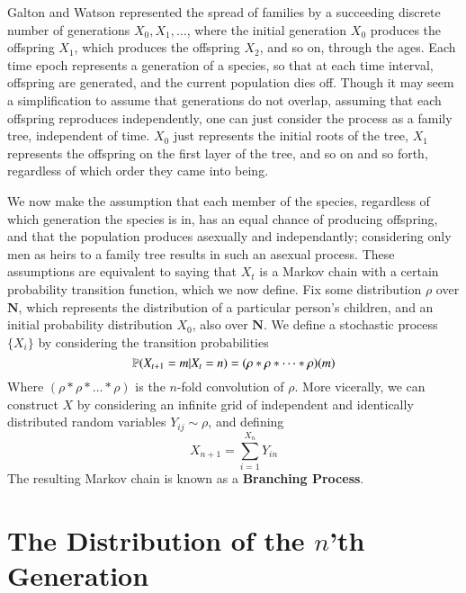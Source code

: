 Galton and Watson represented the spread of families by a succeeding discrete number of generations $X_0, X_1, \dots$, where the initial generation $X_0$ produces the offspring $X_1$, which produces the offspring $X_2$, and so on, through the ages. Each time epoch represents a generation of a species, so that at each time interval, offspring are generated, and the current population dies off. Though it may seem a simplification to assume that generations do not overlap, assuming that each offspring reproduces independently, one can just consider the process as a family tree, independent of time. $X_0$ just represents the initial roots of the tree, $X_1$ represents the offspring on the first layer of the tree, and so on and so forth, regardless of which order they came into being.

We now make the assumption that each member of the species, regardless of which generation the species is in, has an equal chance of producing offspring, and that the population produces asexually and independantly; considering only men as heirs to a family tree results in such an asexual process. These assumptions are equivalent to saying that $X_t$ is a Markov chain with a certain probability transition function, which we now define. Fix some distribution $\rho$ over $\mathbf{N}$, which represents the distribution of a particular person's children, and an initial probability distribution $X_0$, also over $\mathbf{N}$. We define a stochastic process $\{ X_i \}$ by considering the transition probabilities
%
\[ \operatorname{\mathbb{P}}(X_{t+1} = m | X_t = n) = (\rho * \rho * \dots * \rho)(m) \]
%
Where $(\rho * \rho * \dots * \rho)$ is the $n$-fold convolution of $\rho$. More vicerally, we can construct $X$ by considering an infinite grid of independent and identically distributed random variables $Y_{ij} \sim \rho$, and defining
%
\[ X_{n+1} = \sum_{i = 1}^{X_n} Y_{in} \]
%
The resulting Markov chain is known as a {\bf Branching Process}.

\section{The Distribution of the $n$'th Generation}

